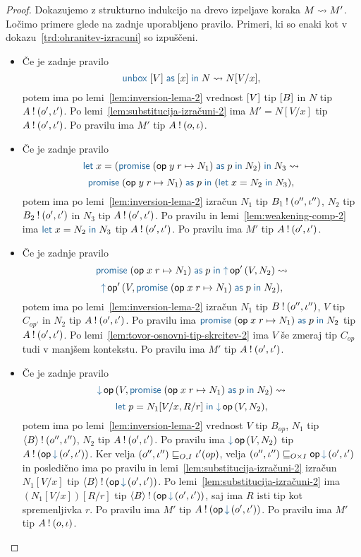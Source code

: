 \begin{proof}
	Dokazujemo z strukturno indukcijo na drevo izpeljave koraka $M \leadsto M'$.
	Ločimo primere glede na zadnje uporabljeno pravilo.
	Primeri, ki so enaki kot v dokazu~\ref{trd:ohranitev-izracuni} so izpuščeni.

	\begin{itemize}
		\item Če je zadnje pravilo $$\tmunbox{[V]}{x}{N} \reduces N[V/x],$$ potem ima po lemi~\ref{lem:inversion-lema-2} vrednost $[V]$ tip $[B]$ in $N$ tip $A \mathbin{!} (o', \iota')$.
		Po lemi~\ref{lem:substitucija-izračuni-2} ima $M' = N[V/x]$ tip $A \mathbin{!} (o', \iota')$.
		Po pravilu  ima $M'$ tip $A \mathbin{!} (o, \iota)$.
		
		\item Če je zadnje pravilo $$\tmlet{x}{(\tmwithrec{op}{y}{r}{N_1}{p}{N_2})}{N_3} \reduces $$ $$ \tmwithrec{op}{y}{r}{N_1}{p}{(\tmlet{x}{N_2}{N_3})},$$ potem ima po lemi~\ref{lem:inversion-lema-2} izračun $N_1$ tip $B_1 \mathbin{!} (o'', \iota'')$, $N_2$ tip $B_2 \mathbin{!} (o', \iota')$ in $N_3$ tip $A \mathbin{!} (o', \iota')$.
		Po pravilu  in lemi~\ref{lem:weakening-comp-2} ima $\tmlet{x}{N_2}{N_3}$ tip $A \mathbin{!} (o', \iota')$.
		Po pravilu  ima $M'$ tip $A \mathbin{!} (o', \iota')$.
		
		\item Če je zadnje pravilo $$\tmwithrec{op}{x}{r}{N_1}{p}{\tmopout{op'}{V}{N_2}} \reduces $$ $$\tmopout{op'}{V}{\tmwithrec{op}{x}{r}{N_1}{p}{N_2}},$$ potem ima po lemi~\ref{lem:inversion-lema-2} izračun $N_1$ tip $B \mathbin{!} (o'', \iota'')$, $V$ tip $C_{op'}$ in $N_2$ tip $A \mathbin{!} (o', \iota')$.
		Po pravilu  ima $\tmwithrec{op}{x}{r}{N_1}{p}{N_2}$ tip $A \mathbin{!} (o', \iota')$.
		Po lemi~\ref{lem:tovor-osnovni-tip-skrcitev-2} ima $V$ še zmeraj tip $C_{op}$ tudi v manjšem kontekstu.
		Po pravilu  ima $M'$ tip $A \mathbin{!} (o', \iota')$.
		
		\item Če je zadnje pravilo $$\tmopin{op}{V}{\tmwithrec{op}{x}{r}{N_1}{p}{N_2}} \reduces $$ $$ \tmlet{p}{N_1[V/x, R/r]}{\tmopin{op}{V}{N_2}},$$ potem ima po lemi~\ref{lem:inversion-lema-2} vrednost $V$ tip $B_{op}$, $N_1$ tip $\langle B \rangle \mathbin{!} (o'', \iota'')$, $N_2$ tip $A \mathbin{!} (o', \iota')$.
		Po pravilu  ima $\tmopin{op}{V}{N_2}$ tip $\tycomp{A}{\opincomp{op}{(\o', \i')}}$.
		Ker velja $(o'', \iota'') \sqsubseteq_{O, I} \iota'(op)$, velja $(\o'', \i'') \order{O \times I} \opincomp{op}{(\o', \i')}$ in posledično ima po pravilu  in lemi~\ref{lem:substitucija-izračuni-2} izračun $N_1[V/x]$ tip $\tycomp{\typromise{B}}{\opincomp{op}{(\o', \i')}}$.
		Po lemi~\ref{lem:substitucija-izračuni-2} ima $(N_1[V/x])[R/r]$ tip $\tycomp{\typromise{B}}{\opincomp{op}{(\o', \i')}}$, saj ima $R$ isti tip kot spremenljivka $r$.
		Po pravilu  ima $M'$ tip $\tycomp{A}{\opincomp{op}{(\o', \i')}}$.
		Po pravilu  ima $M'$ tip $A \mathbin{!} (o, \iota)$.
		

\end{itemize}
\end{proof}
